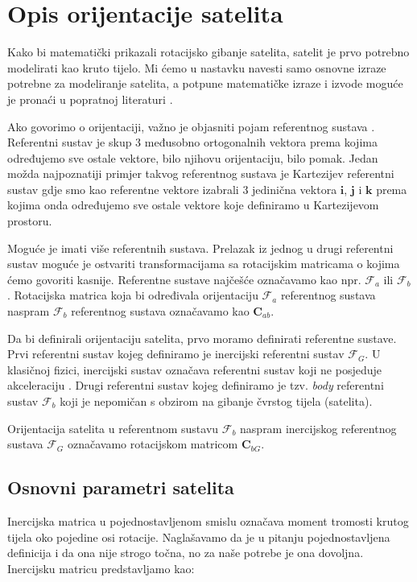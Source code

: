 \documentclass[times, utf8, diplomski, numeric]{templates/template}
\begin{document}
\chapter{Opis orijentacije satelita}{
    Kako bi matematički prikazali rotacijsko gibanje satelita, satelit je prvo potrebno modelirati kao kruto tijelo. Mi ćemo u nastavku navesti samo osnovne izraze potrebne za modeliranje satelita, a potpune matematičke izraze i izvode moguće je pronaći u popratnoj literaturi \cite{adcsKnjiga}.

    Ako govorimo o orijentaciji, važno je objasniti pojam referentnog sustava . Referentni sustav je skup 3 međusobno ortogonalnih vektora prema kojima određujemo sve ostale vektore, bilo njihovu orijentaciju, bilo pomak. Jedan možda najpoznatiji primjer takvog referentnog sustava je Kartezijev referentni sustav gdje smo kao referentne vektore izabrali 3 jedinična vektora $\boldsymbol{i}$, $\boldsymbol{j}$ i $\boldsymbol{k}$ prema kojima onda određujemo sve ostale vektore koje definiramo u Kartezijevom prostoru. 

    Moguće je imati više referentnih sustava. Prelazak iz jednog u drugi referentni sustav moguće je ostvariti transformacijama sa rotacijskim matricama o kojima ćemo govoriti kasnije. Referentne sustave najčešće označavamo kao npr. $\mathcal{F}_a$ ili $\mathcal{F}_b$. Rotacijska matrica koja bi određivala orijentaciju $\mathcal{F}_a$ referentnog sustava naspram $\mathcal{F}_b$ referentnog sustava označavamo kao $\boldsymbol{C}_{ab}$.

    Da bi definirali orijentaciju satelita, prvo moramo definirati referentne sustave. Prvi referentni sustav kojeg definiramo je inercijski referentni sustav $\mathcal{F}_G$. U klasičnoj fizici, inercijski sustav označava referentni sustav koji ne posjeduje akceleraciju \cite{inertialFrame}. Drugi referentni sustav kojeg definiramo je tzv. \emph{body} referentni sustav $\mathcal{F}_b$ koji je nepomičan s obzirom na gibanje čvrstog tijela (satelita).

    Orijentacija satelita u referentnom sustavu $\mathcal{F}_b$ naspram inercijskog referentnog sustava $\mathcal{F}_G$ označavamo rotacijskom matricom $\boldsymbol{C}_{bG}$.

    \section{Osnovni parametri satelita}{
        Inercijska matrica  u pojednostavljenom smislu označava moment tromosti krutog tijela oko pojedine osi rotacije. Naglašavamo da je u pitanju pojednostavljena definicija i da ona nije strogo točna, no za naše potrebe je ona dovoljna. Inercijsku matricu predstavljamo kao:

}}
\end{document}
